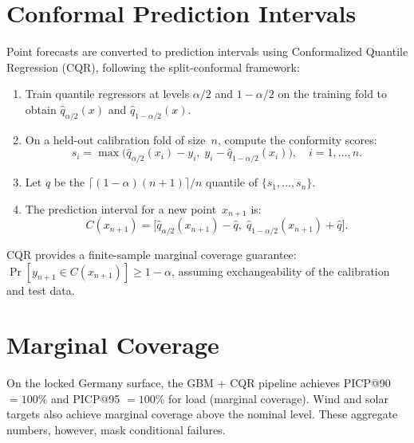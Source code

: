 \section{Conformal Prediction Intervals}
\label{sec:conformal}

Point forecasts are converted to prediction intervals using Conformalized
Quantile Regression (CQR), following the split-conformal framework:

\begin{enumerate}
  \item Train quantile regressors at levels $\alpha/2$ and $1 - \alpha/2$
    on the training fold to obtain $\hat{q}_{\alpha/2}(x)$ and
    $\hat{q}_{1-\alpha/2}(x)$.
  \item On a held-out calibration fold of size~$n$, compute the conformity
    scores:
    \begin{equation}
    \label{eq:cqr-scores}
      s_i = \max\!\bigl(\hat{q}_{\alpha/2}(x_i) - y_i,\;
                        y_i - \hat{q}_{1-\alpha/2}(x_i)\bigr),
      \quad i = 1, \ldots, n.
    \end{equation}
  \item Let $\hat{q}$ be the $\lceil (1-\alpha)(n+1) \rceil / n$
    quantile of $\{s_1, \ldots, s_n\}$.
  \item The prediction interval for a new point~$x_{n+1}$ is:
    \begin{equation}
    \label{eq:cqr-interval}
      C(x_{n+1}) = \bigl[\hat{q}_{\alpha/2}(x_{n+1}) - \hat{q},\;
                         \hat{q}_{1-\alpha/2}(x_{n+1}) + \hat{q}\bigr].
    \end{equation}
\end{enumerate}

CQR provides a finite-sample marginal coverage guarantee:
$\Pr[y_{n+1} \in C(x_{n+1})] \ge 1 - \alpha$, assuming exchangeability
of the calibration and test data.

\section{Marginal Coverage}

On the locked Germany surface, the GBM + CQR pipeline achieves
PICP@90 $= 100\%$ and PICP@95 $= 100\%$ for load (marginal coverage).
Wind and solar targets also achieve marginal coverage above the nominal
level.  These aggregate numbers, however, mask conditional failures.

